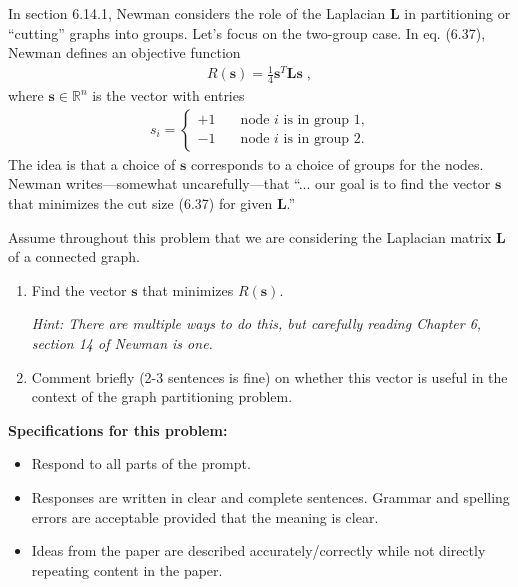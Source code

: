 \documentclass[11pt]{article}
\begin{document}
\newpage
\begin{tcolorbox}[title = 4. Partioning and the Laplacian]
In section 6.14.1, Newman considers the role of the Laplacian $\mathbf{L}$ in partitioning or ``cutting'' graphs into groups.
Let's focus on the two-group case.
In eq. (6.37), Newman defines an objective function 
\begin{align}
    R(\mathbf{s}) = \frac{1}{4}\mathbf{s}^T\mathbf{L}\mathbf{s}\;,
\end{align}
where $\mathbf{s}\in \mathbb{R}^n$ is the vector with entries 
\begin{align}
    s_i = \begin{cases}
        +1 &\quad \text{node } i \text{ is in group 1,} \\ 
        -1 &\quad \text{node } i \text{ is in group 2.}
    \end{cases}
\end{align}
The idea is that a choice of $\mathbf{s}$ corresponds to a choice of groups for the nodes. 
Newman writes---somewhat uncarefully---that ``... our goal is to find the vector $\mathbf{s}$ that minimizes the cut size (6.37) for given $\mathbf{L}$.''

Assume throughout this problem that we are considering the Laplacian matrix $\mathbf{L}$ of a connected graph. 

\begin{enumerate}
    \item
    Find the vector $\mathbf{s}$ that minimizes $R(\mathbf{s})$. 

    {\em Hint:
    There are multiple ways to do this, but carefully reading Chapter 6, section 14 of Newman is one. 
    }

    \item
    Comment briefly (2-3 sentences is fine) on whether this vector is useful in the context of the graph partitioning problem. 
\end{enumerate}
\end{tcolorbox}


\newpage
{\bf Specifications for this problem:}
\begin{itemize}
    \item Respond to all parts of the prompt.
    \item Responses are written in clear and complete sentences. Grammar and spelling errors are acceptable provided that the meaning is clear.
    \item Ideas from the paper are described accurately/correctly while not directly repeating content in the paper.
\end{itemize}
\end{document}
